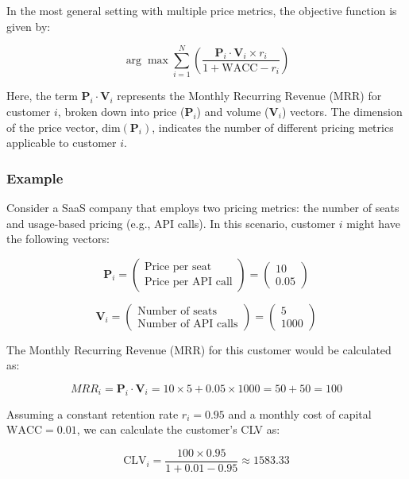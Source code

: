 \documentclass{article}
\begin{document}
In the most general setting with multiple price metrics, the objective function is given by:

\begin{equation}
\arg\max \sum_{i=1}^{N} \left( \frac{\mathbf{P}_{i} \cdot \mathbf{V}_{i} \times r_i}{1 + \text{WACC} - r_i} \right)
\end{equation}

Here, the term \(\mathbf{P}_{i} \cdot \mathbf{V}_{i}\) represents the Monthly Recurring Revenue (MRR) for customer \(i\), broken down into price (\(\mathbf{P}_{i}\)) and volume (\(\mathbf{V}_{i}\)) vectors. The dimension of the price vector, \(\text{dim}(\mathbf{P}_{i})\), indicates the number of different pricing metrics applicable to customer \(i\). \\

\subsubsection{Example}
Consider a SaaS company that employs two pricing metrics: the number of seats and usage-based pricing (e.g., API calls). In this scenario, customer \(i\) might have the following vectors:

\[
\mathbf{P}_i = \begin{pmatrix}
    \text{Price per seat} \\
    \text{Price per API call}
\end{pmatrix}
=
\begin{pmatrix}
    10 \\
    0.05
\end{pmatrix}
\]

\[
\mathbf{V}_i = \begin{pmatrix}
    \text{Number of seats} \\
    \text{Number of API calls}
\end{pmatrix}
=
\begin{pmatrix}
    5 \\
    1000
\end{pmatrix}
\]

The Monthly Recurring Revenue (MRR) for this customer would be calculated as:

\[
MRR_i = \mathbf{P}_i \cdot \mathbf{V}_i = 10 \times 5 + 0.05 \times 1000 = 50 + 50 = 100
\]

Assuming a constant retention rate \( r_i = 0.95 \) and a monthly cost of capital \( \text{WACC} = 0.01 \), we can calculate the customer's CLV as:

\[
\text{CLV}_i = \frac{100 \times 0.95}{1 + 0.01 - 0.95} \approx 1583.33
\]
\end{document}
